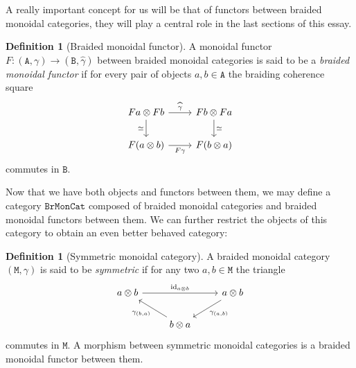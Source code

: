 \documentclass[11pt, reqno]{amsart}
\theoremstyle{definition}
\newtheorem{corollary}[theorem]{Corollary}
\newtheorem{definition}[theorem]{Definition}
\newcommand{\iso}{\simeq}
\newcommand{\dis}{\iso}
\newcommand{\cat}{\texttt}
\newcommand{\catfont}{\texttt}
\newcommand{\BrMonCat}{{\catfont{BrMonCat}}} %
\DeclareMathOperator{\Id}{id}     %
\begin{document}
A really important concept for us will be that of functors between braided
monoidal categories, they will play a central role in the last sections of this
essay.

\begin{definition}[Braided monoidal functor]
\label{def:braided-monoidal-functor}
A monoidal functor \(F: (\cat A, \gamma) \to (\cat B, \widehat \gamma)\) between
braided monoidal categories is said to be a \emph{braided monoidal functor} if
for every pair of objects \(a, b \in \cat A\) the braiding coherence square
\[
\begin{tikzcd}
F a \otimes F b \ar[r, "\widehat\gamma"] \ar[d, "\dis"']
&F b \otimes F a \ar[d, "\dis"] \\
F (a \otimes b) \ar[r, "F \gamma"'] &F (b \otimes a)
\end{tikzcd}
\]
commutes in \(\cat B\).
\end{definition}



Now that we have both objects and functors between them, we may define a
category \(\BrMonCat\) composed of braided monoidal categories and braided
monoidal functors between them. We can further restrict the objects of this
category to obtain an even better behaved category:

\begin{definition}[Symmetric monoidal category]
\label{def:symmetric-monoidal-category}
A braided monoidal category \((\cat M, \gamma)\) is said to be \emph{symmetric}
if for any two \(a, b \in \cat M\) the triangle
\[
\begin{tikzcd}
a \otimes b \ar[rr, "\Id_{a \otimes b}"]
& &a \otimes b \ar[ld, "\gamma_{(a, b)}"] \\
&b \otimes a \ar[lu, "\gamma_{(b, a)}"] &
\end{tikzcd}
\]
commutes in \(\cat M\). A morphism between symmetric monoidal categories is a
braided monoidal functor between them.
\end{definition}
\end{document}
